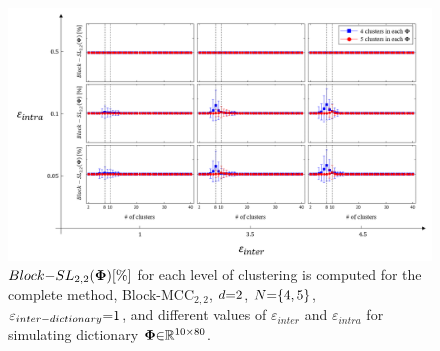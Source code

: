 \begin{figure}[!b]
\centering
\includegraphics[width=1\textwidth,keepaspectratio]{images/SL_Hierarchical_Multimodal.png} %
\centering
\caption{$Block{-}SL_{2,2}(\boldsymbol{\Phi})[\%]$ for each level of clustering is computed for the complete method, Block-MCC$_{2,2}$, $d {=} 2$, $N {=} \{4 , 5 \}$, $\varepsilon_{inter-dictionary} {=} 1$, and different values of $\varepsilon_{inter}$ and $\varepsilon_{intra}$ for simulating dictionary $\boldsymbol{\Phi} {\in} \mathbb{R}^{10 {\times} 80}$.}
\label{fig:SL_Hierarchical_Multimodal}
\end{figure}